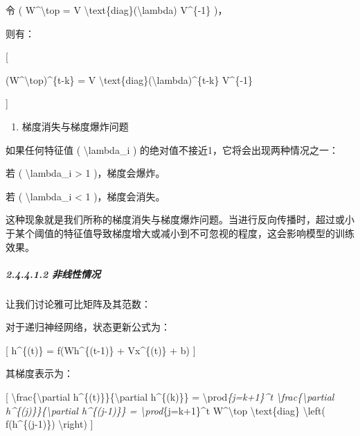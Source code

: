 令 ( W\^{}\textbackslash top = V
\textbackslash text\{diag\}(\textbackslash lambda) V\^{}\{-1\} )，


则有：

{[}

(W\^{}\textbackslash top)\^{}\{t-k\} = V
\textbackslash text\{diag\}(\textbackslash lambda)\^{}\{t-k\}
V\^{}\{-1\}

{]}


\begin{enumerate}
\def\labelenumi{\arabic{enumi}.}
\item
  梯度消失与梯度爆炸问题
\end{enumerate}

如果任何特征值 ( \textbackslash lambda\_i )
的绝对值不接近1，它将会出现两种情况之一：

若 ( \textbar\textbackslash lambda\_i\textbar{} \textgreater{} 1
)，梯度会爆炸。

若 ( \textbar\textbackslash lambda\_i\textbar{} \textless{} 1
)，梯度会消失。

这种现象就是我们所称的梯度消失与梯度爆炸问题。当进行反向传播时，超过或小于某个阈值的特征值导致梯度增大或减小到不可忽视的程度，这会影响模型的训练效果。

\subparagraph{\texorpdfstring{\textbf{2.4.4.1.2}
\textbf{非线性情况}}{2.4.4.1.2 非线性情况}}\label{24412-ux975eux7ebfux6027ux60c5ux51b5}

让我们讨论雅可比矩阵及其范数：

对于递归神经网络，状态更新公式为：

{[} h\^{}\{(t)\} = f(Wh\^{}\{(t-1)\} + Vx\^{}\{(t)\} + b) {]}


其梯度表示为：

{[} \textbackslash frac\{\textbackslash partial
h\^{}\{(t)\}\}\{\textbackslash partial h\^{}\{(k)\}\} =
\textbackslash prod\emph{\{j=k+1\}\^{}t
\textbackslash frac\{\textbackslash partial
h\^{}\{(j)\}\}\{\textbackslash partial h\^{}\{(j-1)\}\} =
\textbackslash prod}\{j=k+1\}\^{}t W\^{}\textbackslash top
\textbackslash text\{diag\} \textbackslash left(
f\textquotesingle(h\^{}\{(j-1)\}) \textbackslash right) {]}


